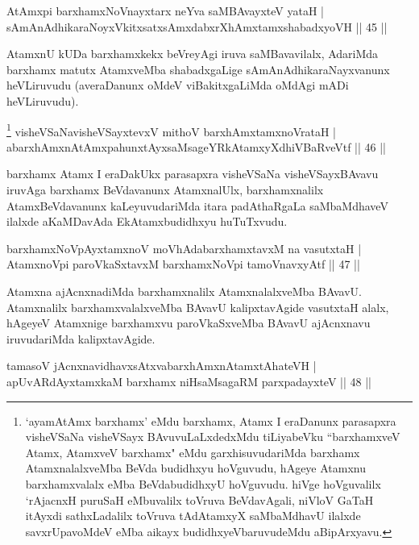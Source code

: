 \begin{shl}
AtAmx\s pi barxhamxNoV\s nayxtarx neYva saMBAvayxteV yataH |\\
sAmAnAdhikaraNoyxVkitxsatxsAmxdabxrXhAmxtamxshabadxyoVH \hfill || 45 ||
\end{shl}

\begin{artha}
AtamxnU kUDa barxhamxkekx beVreyAgi iruva saMBavavilalx, AdariMda barxhamx matutx AtamxveMba shabadxgaLige sAmAnAdhikaraNayxvanunx heVLiruvudu (averaDanunx oMdeV viBakitxgaLiMda oMdAgi mADi heVLiruvudu).
\end{artha}

\begin{shl}
\footnote{`ayamAtAmx barxhamx' eMdu barxhamx, Atamx I eraDanunx parasapxra visheVSaNa visheVSayx BAvuvuLaLxdedxMdu tiLiyabeVku ``barxhamxveV Atamx, AtamxveV barxhamx" eMdu garxhisuvudariMda barxhamx AtamxnalalxveMba BeVda budidhxyu hoVguvudu, hAgeye Atamxnu barxhamxvalalx eMba BeVdabudidhxyU hoVguvudu. hiVge hoVguvalilx `rAjacnxH puruSaH eMbuvalilx toVruva BeVdavAgali, niVloV GaTaH itAyxdi sathxLadalilx toVruva tAdAtamxyX saMbaMdhavU ilalxde savxrUpavoMdeV eMba aikayx budidhxyeVbaruvudeMdu aBipArxyavu.} visheVSaNavisheVSayxtevxV mithoV barxhAmxtamxnoVrataH |\\
abarxhAmxnAtAmxpahunxtAyx\s saMsageYRkAtamxyXdhiVBaRveVtf \hfill || 46 ||
\end{shl}

\begin{artha}
barxhamx Atamx I eraDakUkx parasapxra visheVSaNa visheVSayxBAvavu iruvAga barxhamx BeVdavanunx AtamxnalUlx, barxhamxnalilx AtamxBeVdavanunx kaLeyuvudariMda itara padAthaRgaLa saMbaMdhaveV ilalxde aKaMDavAda EkAtamxbudidhxyu huTuTxvudu.
\end{artha}

\begin{shl}
barxhamxNoV\s pAyxtamxnoV moVhAdabarxhamxtavxM na vasutxtaH |\\
AtamxnoV\s pi paroVkaSxtavxM barxhamxNoV\s pi tamoVnavxyAtf \hfill || 47 ||
\end{shl}	

\begin{artha}%
Atamxna ajAcnxnadiMda barxhamxnalilx AtamxnalalxveMba BAvavU. Atamxnalilx barxhamxvalalxveMba BAvavU kalipxtavAgide vasutxtaH alalx, hAgeyeV Atamxnige barxhamxvu paroVkaSxveMba BAvavU ajAcnxnavu iruvudariMda kalipxtavAgide. 
\end{artha}

\begin{shl}
tamasoV jAcnxnavidhavxsAtxvabarxhAmxnAtamxtAhateVH |\\
apUvARdAyxtamxkaM barxhamx niHsaMsagaRM parxpadayxteV \hfill || 48 ||
\end{shl}


